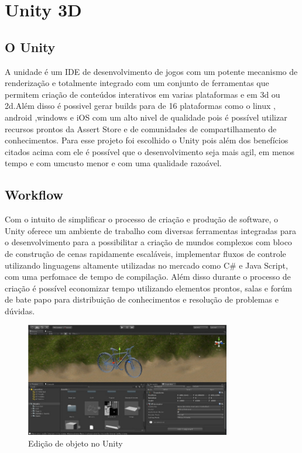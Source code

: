 \section{Unity 3D} %
\label{sec:unity_3d}

\subsection{O Unity }
\label{sub:o_unity}
	A unidade é um IDE de desenvolvimento de jogos com um potente mecanismo de renderização e totalmente integrado com um conjunto de ferramentas que permitem criação de conteúdos interativos em varias plataformas e em  3d ou 2d.Além disso é possivel gerar builds para de 16 plataformas  como o linux , android ,windows e iOS com um alto nivel de qualidade pois é possível utilizar recursos prontos da Assert Store e de comunidades de compartilhamento de conhecimentos. 
	Para esse projeto foi escolhido o Unity pois  além dos benefícios citados acima com ele é possível que o desenvolvimento seja mais agil, em menos tempo e com umcusto menor e com uma qualidade razoável. 

\subsection{Workflow} %
\label{sub:workflow}
	Com o intuito de simplificar o processo de criação e produção de software, o Unity oferece um ambiente de trabalho com diversas ferramentas integradas para o desenvolvimento para a possibilitar a criação de mundos complexos com bloco de construção de cenas rapidamente escaláveis, implementar fluxos de controle utilizando linguagens altamente utilizadas no mercado como C\# e Java Script, com uma perfomace de tempo de compilação. Além disso durante o processo de criação é possível economizar tempo utilizando elementos prontos, salas e forúm de bate papo para distribuição de conhecimentos e resolução de problemas e dúvidas.

\begin{figure}[h]
  \centering
  \includegraphics[width=0.8\textwidth]
      {figuras/bike.png}
  \caption{Edição de objeto no Unity}
  \label{coordenadas-rift}
\end{figure}

